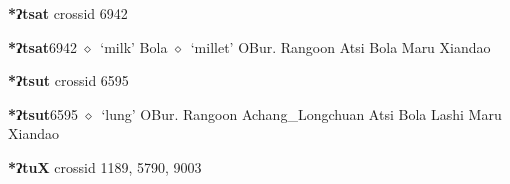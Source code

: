 \item
\textbf{*ʔtsat}
  {\tiny crossid 6942}
  \begin{list}{}{\leftmargin=1.5em \itemindent=-1.5em}
  \item {\footnotesize \textbf{*ʔtsat}}{\tiny 6942}
         $\diamond$~`milk'
         Bola 
\hspace{1ex}
         $\diamond$~`millet'
         OBur. 
\hspace{1ex}
         Rangoon 
\hspace{1ex}
         Atsi 
\hspace{1ex}
         Bola 
\hspace{1ex}
         Maru 
\hspace{1ex}
         Xiandao 
  \end{list}
\item
\textbf{*ʔtsut}
  {\tiny crossid 6595}
  \begin{list}{}{\leftmargin=1.5em \itemindent=-1.5em}
  \item {\footnotesize \textbf{*ʔtsut}}{\tiny 6595}
         $\diamond$~`lung'
         OBur. 
\hspace{1ex}
         Rangoon 
\hspace{1ex}
         Achang\_Longchuan 
\hspace{1ex}
         Atsi 
\hspace{1ex}
         Bola 
\hspace{1ex}
         Lashi 
\hspace{1ex}
         Maru 
\hspace{1ex}
         Xiandao 
  \end{list}
\item
\textbf{*ʔtuX}
  {\tiny crossid 1189, 5790, 9003}
